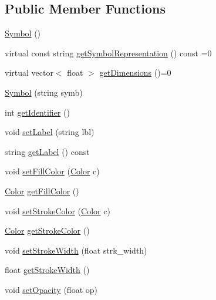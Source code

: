 \subsection*{Public Member Functions}
\begin{DoxyCompactItemize}
\item 
\mbox{\hyperlink{classbridges_1_1_symbol_a4e1ce195ffc6c99e7f597ef63ed40aa6}{Symbol}} ()
\item 
virtual const string \mbox{\hyperlink{classbridges_1_1_symbol_ab4dd31fbc736b2e58e8b8bb8446eac73}{get\+Symbol\+Representation}} () const =0
\item 
virtual vector$<$ float $>$ \mbox{\hyperlink{classbridges_1_1_symbol_a6eb190dc71b31b344b7610a07c6dc1d5}{get\+Dimensions}} ()=0
\item 
\mbox{\hyperlink{classbridges_1_1_symbol_a047f3b1508fb62efdca8b688f462a866}{Symbol}} (string symb)
\item 
int \mbox{\hyperlink{classbridges_1_1_symbol_a6006dfc7fcaeff3dbead8bcf647ccff6}{get\+Identifier}} ()
\item 
void \mbox{\hyperlink{classbridges_1_1_symbol_afd181fe1e860542548efc4244e06f609}{set\+Label}} (string lbl)
\item 
string \mbox{\hyperlink{classbridges_1_1_symbol_a6d19ee38cdb8a07a19cf53840e93cbbb}{get\+Label}} () const
\item 
void \mbox{\hyperlink{classbridges_1_1_symbol_a20315217d30c3c747b5b6da60c08c2c9}{set\+Fill\+Color}} (\mbox{\hyperlink{classbridges_1_1_color}{Color}} c)
\item 
\mbox{\hyperlink{classbridges_1_1_color}{Color}} \mbox{\hyperlink{classbridges_1_1_symbol_affd9e9f49524a920d53a490782fab9c9}{get\+Fill\+Color}} ()
\item 
void \mbox{\hyperlink{classbridges_1_1_symbol_a813783a031eb5fcc841a549be384f876}{set\+Stroke\+Color}} (\mbox{\hyperlink{classbridges_1_1_color}{Color}} c)
\item 
\mbox{\hyperlink{classbridges_1_1_color}{Color}} \mbox{\hyperlink{classbridges_1_1_symbol_ad783260351a4e85612807d039565880d}{get\+Stroke\+Color}} ()
\item 
void \mbox{\hyperlink{classbridges_1_1_symbol_a29e8e8b80ea1aba0a99abdacd7c8ec17}{set\+Stroke\+Width}} (float strk\+\_\+width)
\item 
float \mbox{\hyperlink{classbridges_1_1_symbol_a59ee674a1eaf79c7611ef8377cba2d0b}{get\+Stroke\+Width}} ()
\item 
void \mbox{\hyperlink{classbridges_1_1_symbol_a586939c47e544093cbd8f443bed8dfee}{set\+Opacity}} (float op)

\end{DoxyCompactItemize}
